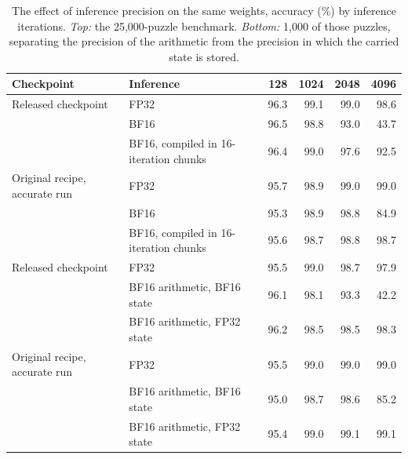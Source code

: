 \begin{table}[h]
\centering
\small
\caption{The effect of inference precision on the same weights, accuracy (\%) by inference iterations. \emph{Top:} the 25,000-puzzle benchmark. \emph{Bottom:} 1,000 of those puzzles, separating the precision of the arithmetic from the precision in which the carried state is stored.}
\label{tab:precision}
\begin{tabular}{@{}llrrrr@{}}
\toprule
Checkpoint & Inference & 128 & 1024 & 2048 & 4096 \\
\midrule
Released checkpoint & FP32 & 96.3 & 99.1 & 99.0 & 98.6 \\
 & BF16 & 96.5 & 98.8 & 93.0 & 43.7 \\
 & BF16, compiled in 16-iteration chunks & 96.4 & 99.0 & 97.6 & 92.5 \\
\addlinespace
Original recipe, accurate run & FP32 & 95.7 & 98.9 & 99.0 & 99.0 \\
 & BF16 & 95.3 & 98.9 & 98.8 & 84.9 \\
 & BF16, compiled in 16-iteration chunks & 95.6 & 98.7 & 98.8 & 98.7 \\
\midrule
Released checkpoint & FP32 & 95.5 & 99.0 & 98.7 & 97.9 \\
 & BF16 arithmetic, BF16 state & 96.1 & 98.1 & 93.3 & 42.2 \\
 & BF16 arithmetic, FP32 state & 96.2 & 98.5 & 98.5 & 98.3 \\
\addlinespace
Original recipe, accurate run & FP32 & 95.5 & 99.0 & 99.0 & 99.0 \\
 & BF16 arithmetic, BF16 state & 95.0 & 98.7 & 98.6 & 85.2 \\
 & BF16 arithmetic, FP32 state & 95.4 & 99.0 & 99.1 & 99.1 \\
\bottomrule
\end{tabular}
\end{table}%
